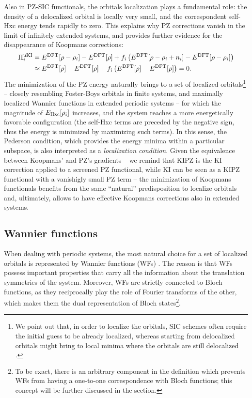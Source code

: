 Also in PZ-SIC functionals, the orbitals localization plays a fundamental role: the density of a delocalized orbital is locally very small, and the correspondent self-Hxc energy tends rapidly to zero. This explains why PZ corrections vanish in the limit of infinitely extended systems, and provides further evidence for the disappearance of Koopmans corrections:
%
\begin{equation}
    \begin{split}
    \Pi_i^{\rm uKI} &= E^{\rm DFT}[\rho - \rho_i] - E^{\rm DFT}[\rho] + f_i \left( E^{\rm DFT}[\rho - \rho_i + n_i] - E^{\rm DFT}[\rho - \rho_i] \right) \\
    &\approx E^{\rm DFT}[\rho] - E^{\rm DFT}[\rho] + f_i \left( E^{\rm DFT}[\rho] - E^{\rm DFT}[\rho] \right) = 0 .
    \end{split}
    \label{eq:vanishing-ki-correction}
\end{equation}
%
The minimization of the PZ energy naturally brings to a set of localized orbitals\footnote{We point out that, in order to localize the orbitals, SIC schemes often require the initial guess to be already localized, whereas starting from delocalized orbitals might bring to local minima where the orbitals are still delocalized \cite{korzdorfer_relation_2011}.} -- closely resembling Foster-Boys orbitals \cite{boys_construction_1960,foster_canonical_1960} in finite systems, and maximally localized Wannier functions \cite{marzari_maximally_1997,marzari_maximally_2012} in extended periodic systems \cite{nguyen_koopmans-compliant_2018} -- for which the magnitude of $E_{\rm Hxc}[\rho_i]$ increases, and the system reaches a more energetically favorable configuration (the self-Hxc terms are preceded by the negative sign, thus the energy is minimized by maximizing such terms). In this sense, the Pederson condition, which provides the energy minima within a particular subspace, is also interpreted as a \emph{localization condition}. Given the equivalence between Koopmans' and PZ's gradients -- we remind that KIPZ is the KI correction applied to a screened PZ functional, while KI can be seen as a KIPZ functional with a vanishigly small PZ term -- the minimization of Koopmans functionals benefits from the same ``natural'' predisposition to localize orbitals and, ultimately, allows to have effective Koopmans corrections also in extended systems.

\subsection{Wannier functions\label{sec:wannier-functions}}
When dealing with periodic systems, the most natural choice for a set of localized orbitals is represented by Wannier functions (WFs) \cite{wannier_structure_1937}. The reason is that WFs possess important properties that carry all the information about the translation symmetries of the system. Moreover, WFs are strictly connected to Bloch functions, as they reciprocally play the role of Fourier transforms of the other, which makes them the dual representation of Bloch states\footnote{To be exact, there is an arbitrary component in the definition which prevents WFs from having a one-to-one correspondence with Bloch functions; this concept will be further discussed in the section.}.


